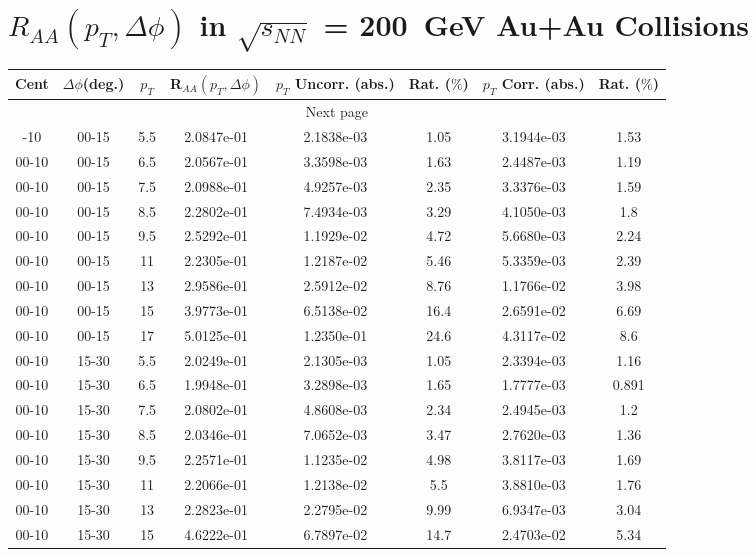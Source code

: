 \chapter{$R_{AA}(p_{T},\Delta\phi)$ in $\sqrt{s_{NN}}$ = 200~GeV Au+Au Collisions}
\begin{longtable}{|cccccccc|}
\hline
Cent & $\Delta\phi$(deg.) & $p_{T}$ & R$_{AA}(p_{T},\Delta\phi)$ & $p_{T}$ Uncorr. (abs.) & Rat. ($\%$) & $p_{T}$ Corr. (abs.) & Rat. ($\%$)  \\
\hline
\endhead
\hline \multicolumn{8}{|c|}{{Next page}} \\
\hline
\endfoot
\endlastfoot
\hline
00-10 & 00-15 & 5.5 & 2.0847e-01 & 2.1838e-03 & 1.05 & 3.1944e-03 & 1.53 \\ 
00-10 & 00-15 & 6.5 & 2.0567e-01 & 3.3598e-03 & 1.63 & 2.4487e-03 & 1.19 \\ 
00-10 & 00-15 & 7.5 & 2.0988e-01 & 4.9257e-03 & 2.35 & 3.3376e-03 & 1.59 \\ 
00-10 & 00-15 & 8.5 & 2.2802e-01 & 7.4934e-03 & 3.29 & 4.1050e-03 & 1.8 \\ 
00-10 & 00-15 & 9.5 & 2.5292e-01 & 1.1929e-02 & 4.72 & 5.6680e-03 & 2.24 \\ 
00-10 & 00-15 & 11 & 2.2305e-01 & 1.2187e-02 & 5.46 & 5.3359e-03 & 2.39 \\ 
00-10 & 00-15 & 13 & 2.9586e-01 & 2.5912e-02 & 8.76 & 1.1766e-02 & 3.98 \\ 
00-10 & 00-15 & 15 & 3.9773e-01 & 6.5138e-02 & 16.4 & 2.6591e-02 & 6.69 \\ 
00-10 & 00-15 & 17 & 5.0125e-01 & 1.2350e-01 & 24.6 & 4.3117e-02 & 8.6 \\ 
\hline
00-10 & 15-30 & 5.5 & 2.0249e-01 & 2.1305e-03 & 1.05 & 2.3394e-03 & 1.16 \\ 
00-10 & 15-30 & 6.5 & 1.9948e-01 & 3.2898e-03 & 1.65 & 1.7777e-03 & 0.891 \\ 
00-10 & 15-30 & 7.5 & 2.0802e-01 & 4.8608e-03 & 2.34 & 2.4945e-03 & 1.2 \\ 
00-10 & 15-30 & 8.5 & 2.0346e-01 & 7.0652e-03 & 3.47 & 2.7620e-03 & 1.36 \\ 
00-10 & 15-30 & 9.5 & 2.2571e-01 & 1.1235e-02 & 4.98 & 3.8117e-03 & 1.69 \\ 
00-10 & 15-30 & 11 & 2.2066e-01 & 1.2138e-02 & 5.5 & 3.8810e-03 & 1.76 \\ 
00-10 & 15-30 & 13 & 2.2823e-01 & 2.2795e-02 & 9.99 & 6.9347e-03 & 3.04 \\ 
00-10 & 15-30 & 15 & 4.6222e-01 & 6.7897e-02 & 14.7 & 2.4703e-02 & 5.34 \\ 

\end{longtable}
